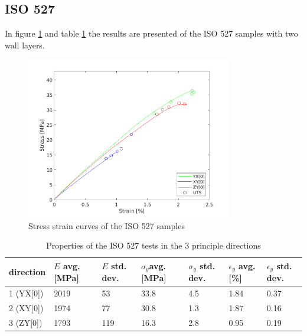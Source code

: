 \subsection{ISO 527}
In figure \ref{fig:ISO527results} and table \ref{tab:ISO527results} the results are presented of the ISO 527 samples with two wall layers.
\begin{figure}[H]
    \centering
    \includegraphics[width=0.80\textwidth]{chapter_5_Experimentaltesting/figures/ISOTensiletests.png}
    \caption{Stress strain curves of the ISO 527 samples}
    \label{fig:ISO527results}
\end{figure}

\begin{table}[ht]
\centering
\caption{Properties of the ISO 527 tests in the 3 principle directions}
          \label{tab:ISO527results}
\begin{tabular}{ p{1.5cm}p{1cm}p{1cm}p{1cm}p{1cm}p{1cm}p{1cm}  }
\hline
direction & $E$ avg. [MPa] & $E$ std. dev. & $\sigma_y$avg. [MPa] & $\sigma_y$ std. dev. & $\epsilon_y$ avg. [\%] & $\epsilon_y$   std. dev. \\
 \hline
1 (YX[0]) & 2019 & 53 & 33.8 & 4.5 & 1.84 & 0.37 \\
2 (XY[0]) & 1974 & 77 & 30.8 & 1.3 & 1.87 & 0.16 \\
3 (ZY[0]) & 1793 & 119 & 16.3 & 2.8 & 0.95 & 0.19\\
 \hline
\end{tabular}
\end{table}



